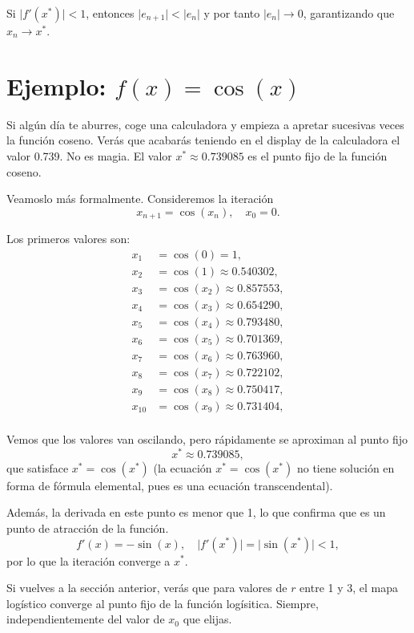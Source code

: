 \documentclass[
  10pt,
  a4paper,
  DIV=11,
  numbers=noendperiod,
  open=any]{scrreprt}
\numberwithin{equation}{chapter}
\numberwithin{equation}{chapter}
\renewcommand{\[}{\begin{equation}}
\renewcommand{\]}{\end{equation}}
\begin{document}
Si \(\lvert f'(x^*)\rvert < 1\), entonces
\(\lvert e_{n+1}\rvert < \lvert e_n\rvert\) y por tanto
\(\lvert e_n\rvert\to0\), garantizando que \(x_n\to x^*\).

\section{\texorpdfstring{Ejemplo:
\(f(x)=\cos(x)\)}{Ejemplo: f(x)=\textbackslash cos(x)}}\label{ejemplo-fxcosx}

Si algún día te aburres, coge una calculadora y empieza a apretar
sucesivas veces la función coseno. Verás que acabarás teniendo en el
display de la calculadora el valor 0.739. No es magia. El valor
\(x^* \approx 0.739085\) es el punto fijo de la función coseno.

Veamoslo más formalmente. Consideremos la iteración \[
x_{n+1} = \cos(x_n), \quad x_0 = 0.
\]

Los primeros valores son: \[
\begin{align*}
x_1 &= \cos(0)=1,\\
x_2 &= \cos(1)\approx0.540302,\\
x_3 &= \cos(x_2)\approx0.857553,\\
x_4 &= \cos(x_3)\approx0.654290,\\
x_5 &= \cos(x_4)\approx0.793480,\\
x_6 &= \cos(x_5)\approx0.701369,\\
x_7 &= \cos(x_6)\approx0.763960,\\
x_8 &= \cos(x_7)\approx0.722102,\\
x_9 &= \cos(x_8)\approx0.750417,\\
x_{10} &= \cos(x_9)\approx0.731404,\\
\end{align*}
\]

Vemos que los valores van oscilando, pero rápidamente se aproximan al
punto fijo \[
x^* \approx 0.739085,
\] que satisface \(x^* = \cos(x^*)\) (la ecuación \(x^* = \cos(x^*)\) no
tiene solución en forma de fórmula elemental, pues es una ecuación
transcendental).

Además, la derivada en este punto es menor que 1, lo que confirma que es
un punto de atracción de la función. \[
f'(x) = -\sin(x),
\quad
\lvert f'(x^*)\rvert = \lvert\sin(x^*)\rvert < 1,
\] por lo que la iteración converge a \(x^*\).

Si vuelves a la sección anterior, verás que para valores de \(r\) entre
1 y 3, el mapa logístico converge al punto fijo de la función
logísitica. Siempre, independientemente del valor de \(x_0\) que elijas.
\end{document}
